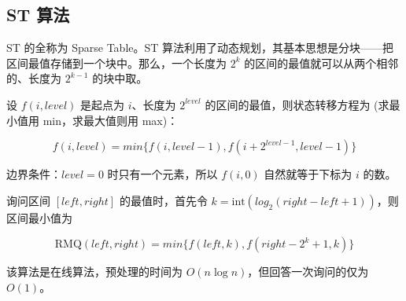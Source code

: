 \subsection{ST 算法}
	ST 的全称为 Sparse Table。ST 算法利用了动态规划，其基本思想是分块------把区间最值存储到一个块中。那么，一个长度为 $2^{k}$ 的区间的最值就可以从两个相邻的、长度为 $2^{{k-1}}$ 的块中取。
	
	设 $f(i,level)$ 是起点为 $i$、长度为 $2^{{level}}$ 的区间的最值，则状态转移方程为 (求最小值用 min，求最大值则用 max)：
	
	\[
		f(i,level)=min\{f(i,level-1),f(i+2^{{level-1}},level-1)\}
	\]
	
	边界条件：$level=0$ 时只有一个元素，所以 $f(i,0)$ 自然就等于下标为 $i$ 的数。
	
	询问区间 $[left,right]$ 的最值时，首先令 $k={\mathrm {int}}(log_{2}(right-left+1))$，则区间最小值为
	
	\[
		\textrm{RMQ}(left,right)=min\{f(left,k),f(right-2^{k}+1,k)\}
	\]
	
	该算法是在线算法，预处理的时间为 $O(n\log n)$，但回答一次询问的仅为 $O(1)$。
	
	